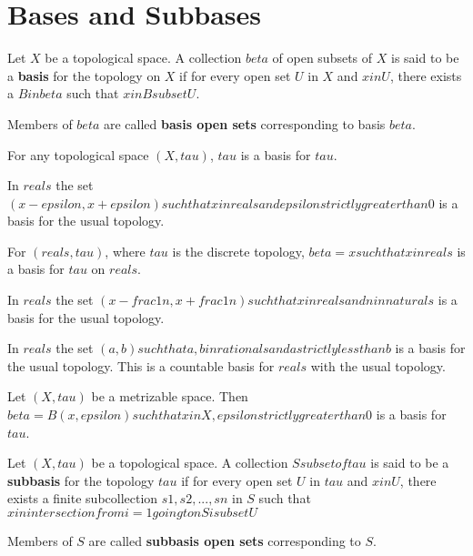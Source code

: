 \section{Bases and Subbases}

\begin{defn}
    Let $X$ be a topological space. A collection $beta$ of open subsets of $X$ is said to be a \textbf{basis} for the topology on $X$ if for every open set $U$ in $X$ and $x in U$, there exists a $B in beta$ such that $x in B subset U$.

    Members of $beta$ are called \textbf{basis open sets} corresponding to basis $beta$.
\end{defn}

\begin{note}
    For any topological space $(X, tau)$, $tau$ is a basis for $tau$.
\end{note}

\begin{note}
    In $reals$ the set ${{ (x - epsilon, x + epsilon) such that x in reals and epsilon strictly greater than 0 }}$ is a basis for the usual topology.
\end{note}

\begin{note}
    For $(reals, tau)$, where $tau$ is the discrete topology, $beta = {{ {{ x }} such that x in reals }}$ is a basis for $tau$ on $reals$.
\end{note}

\begin{note}
    In $reals$ the set ${{ (x - frac{1}{n}, x + frac{1}{n}) such that x in reals and n in naturals }}$ is a basis for the usual topology.
\end{note}

\begin{note}
    In $reals$ the set ${{ (a, b) such that a,b in rationals and a strictly less than b }}$ is a basis for the usual topology. This is a countable basis for $reals$ with the usual topology.
\end{note}

\begin{note}
    Let $(X, tau)$ be a metrizable space. Then $beta = {{ B(x, epsilon) such that x in X, epsilon strictly greater than 0 }}$ is a basis for $tau$.
\end{note}

\begin{defn}
    Let $(X, tau)$ be a topological space. A collection $S subset of tau$ is said to be a \textbf{subbasis} for the topology $tau$ if for every open set $U$ in $tau$ and $x in U$, there exists a finite subcollection ${{ s1, s2, ..., sn }}$ in $S$ such that $x in intersection from {i = 1} going to n Si subset U$

    Members of $S$ are called \textbf{subbasis open sets} corresponding to $S$.
\end{defn}


